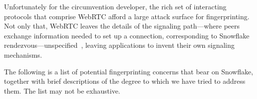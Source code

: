 \documentclass[letterpaper,twocolumn]{article}
\begin{document}
Unfortunately for the circumvention developer,
the rich set of interacting protocols that comprise WebRTC
afford a large attack surface for fingerprinting.
Not only that, WebRTC leaves the details of
the signaling path---where peers exchange information
needed to set up a connection,
corresponding to Snowflake rendezvous---unspecified~\cite[\S 3]{rfc8825},
leaving applications to invent their own signaling mechanisms.

The following is a list of potential fingerprinting concerns
that bear on Snowflake, together with brief descriptions
of the degree to which we have tried to address them.
The list may not be exhaustive.
\end{document}
